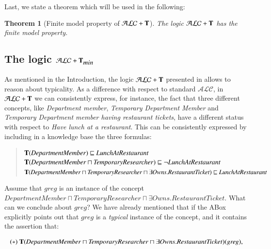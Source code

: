 \documentclass[a4paper, 11pt, oneside]{elsarticle}
\newcommand{\tip}{{\bf T}}
\newcommand{\alc}{\mathcal{ALC}}
\newcommand{\alct}{\mathcal{ALC}+\tip}
\newcommand{\alctmin}{\mathcal{ALC}+\tip_{\mbox{\em min}}}
\newcommand{\nott} {\lnot}
\newcommand{\sqset}{\sqsubseteq}
\newcommand{\mint}{\sqcap}
\newtheorem{theorem}{Theorem}
\newcounter{posu}
\newtheorem{theorem}[posu]{Theorem}
\begin{document}


Last, we state a theorem which will be used in the following:

\begin{theorem}[Finite model property of $\alct$]\label{fmpALCT}
The logic $\alct$ has the finite model property.
\end{theorem}




\subsection{The logic $\alctmin$}\label{alctmin}

As mentioned in the Introduction, the logic $\alct$ presented in
\cite{FI09} allows  to reason about typicality. As a difference
with respect to standard $\alc$, in $\alct$ we can consistently
express, for instance, the fact that three different concepts,
like {\em Department member}, {\em Temporary Department Member}
and {\em Temporary Department member having restaurant tickets},
have a different status with respect to {\em Have lunch at a
restaurant}. This can be consistently expressed by including in a
knowledge base the three formulas:

\begin{quote}
$\tip (\mathit{DepartmentMember}) \sqset \mathit{LunchAtRestaurant}$\\
$\tip (\mathit{DepartmentMember} \mint \mathit{TemporaryResearcher})  \sqset \nott \mathit{LunchAtRestaurant}$\\
$\tip (\mathit{DepartmentMember} \mint \mathit{TemporaryResearcher} \mint \exists \mathit{Owns}.\mathit{RestaurantTicket})  \sqset \mathit{LunchAtRestaurant}$
\end{quote}

\noindent Assume that $\mathit{greg}$ is an instance of the concept
$\mathit{DepartmentMember} \sqcap \mathit{TemporaryResearcher} \sqcap \exists \mathit{Owns}.\mathit{RestaurantTicket}$. What can we conclude about
$\mathit{\mathit{greg}}$? We have already mentioned that if the ABox explicitly points out that $\mathit{greg}$ is a {\em typical} instance of the  concept, and it contains the assertion that:

$$(*)  \ \tip(\mathit{DepartmentMember} \sqcap \mathit{TemporaryResearcher} \sqcap \exists \mathit{Owns}.\mathit{RestaurantTicket})(\mathit{greg}),$$
\end{document}
